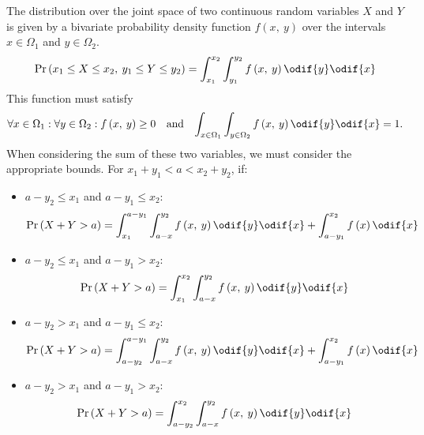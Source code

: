 \documentclass{article}
\begin{document}
\begin{definition}
    The distribution over the joint space of two continuous random variables \(X\) and \(Y\) is  given by a
    bivariate probability density function \(f\left( x,\: y \right)\)
    over the intervals \(x \in \Omega_1\) and \(y \in \Omega_2\).
    \begin{equation*}
        \Pr{\left( x_1 \leq X \leq x_2,\: y_1 \leq Y \leq y_2 \right)} = \int_{x_1}^{x_2} \int_{y_1}^{y_2} f\left( x,\: y \right) \odif{y} \odif{x}
    \end{equation*}
    This function must satisfy
    \begin{align*}
        \forall x \in \Omega_1 : \forall y \in \Omega_2 : f\left( x,\: y \right) \geq 0 &  & \text{and} &  &
        \int_{x \in \Omega_1} \int_{y \in \Omega_2} f\left( x,\: y \right) \odif{y} \odif{x} = 1.
    \end{align*}
    When considering the sum of these two variables, we must consider the appropriate bounds.
    For \(x_1 + y_1 < a < x_2 + y_2\), if:
    \begin{itemize}
        \item \(a - y_2 \leq x_1\) and \(a - y_1 \leq x_2\):
              \begin{equation*}
                  \Pr{\left( X + Y > a \right)} = \int_{x_1}^{a - y_1} \int_{a - x}^{y_2} f\left( x,\: y \right) \odif{y} \odif{x} + \int_{a - y_1}^{x_2} f\left( x \right) \odif{x}
              \end{equation*}
        \item \(a - y_2 \leq x_1\) and \(a - y_1 > x_2\):
              \begin{equation*}
                  \Pr{\left( X + Y > a \right)} = \int_{x_1}^{x_2} \int_{a - x}^{y_2} f\left( x,\: y \right) \odif{y} \odif{x}
              \end{equation*}
        \item \(a - y_2 > x_1\) and \(a - y_1 \leq x_2\):
              \begin{equation*}
                  \Pr{\left( X + Y > a \right)} = \int_{a - y_2}^{a - y_1} \int_{a - x}^{y_2} f\left( x,\: y \right) \odif{y} \odif{x} + \int_{a - y_1}^{x_2} f\left( x \right) \odif{x}
              \end{equation*}
        \item \(a - y_2 > x_1\) and \(a - y_1 > x_2\):
              \begin{equation*}
                  \Pr{\left( X + Y > a \right)} = \int_{a - y_2}^{x_2} \int_{a - x}^{y_2} f\left( x,\: y \right) \odif{y} \odif{x}
              \end{equation*}
    \end{itemize}
\end{definition}
\end{document}
